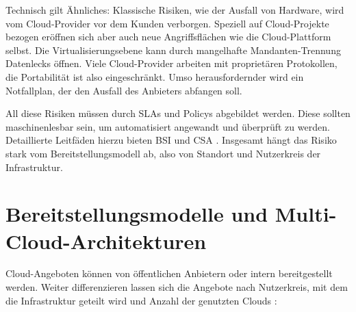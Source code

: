 Technisch gilt Ähnliches: Klassische Risiken, wie der Ausfall von Hardware, wird vom Cloud-Provider vor dem Kunden verborgen. Speziell auf Cloud-Projekte bezogen eröffnen sich aber auch neue Angriffsflächen wie die Cloud-Plattform selbst. Die Virtualisierungsebene kann durch mangelhafte Mandanten-Trennung Datenlecks öffnen. Viele Cloud-Provider arbeiten mit proprietären Protokollen, die Portabilität ist also eingeschränkt. Umso herausfordernder wird ein Notfallplan, der den Ausfall des Anbieters abfangen soll.

All diese Risiken müssen durch SLAs und Policys abgebildet werden. Diese sollten maschinenlesbar sein, um automatisiert angewandt und überprüft zu werden. Detaillierte Leitfäden hierzu bieten BSI und CSA \cite{bsi:2014:Sicherheitsrichtlinie, csa:2015:star}. Insgesamt hängt das Risiko stark vom Bereitstellungsmodell ab, also von Standort und Nutzerkreis der Infrastruktur.

\section{Bereitstellungsmodelle und Multi-Cloud-Architekturen}


Cloud-Angeboten können von öffentlichen Anbietern oder intern bereitgestellt werden. Weiter differenzieren lassen sich die Angebote nach Nutzerkreis, mit dem die Infrastruktur geteilt wird und Anzahl der genutzten Clouds \cite{petcu:2014:cloud-taxonomy, grozev:2014:cloud-taxonomy}:

